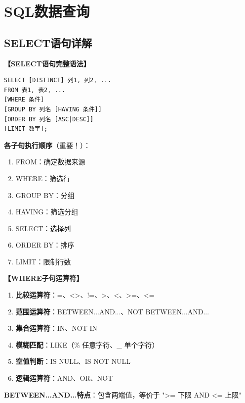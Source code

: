 \documentclass[12pt, a4paper]{article}
\newenvironment{bluebox}[1]{%
  \begin{trivlist}
  \item[\hskip\labelsep \textbf{#1}]
  \setlength{\parskip}{0.5ex}
  \setlength{\itemsep}{0.5ex}
}{%
  \end{trivlist}
}
\begin{document}
\section{SQL数据查询}

\subsection{SELECT语句详解}

\begin{bluebox}{SELECT语句结构}
	\textbf{【SELECT语句完整语法】}

	\begin{verbatim}
SELECT [DISTINCT] 列1, 列2, ...
FROM 表1, 表2, ...
[WHERE 条件]
[GROUP BY 列名 [HAVING 条件]]
[ORDER BY 列名 [ASC|DESC]]
[LIMIT 数字];
	\end{verbatim}

	\textbf{各子句执行顺序}（重要！）：
	\begin{enumerate}
		\item FROM：确定数据来源
		\item WHERE：筛选行
		\item GROUP BY：分组
		\item HAVING：筛选分组
		\item SELECT：选择列
		\item ORDER BY：排序
		\item LIMIT：限制行数
	\end{enumerate}
\end{bluebox}

\begin{bluebox}{WHERE子句条件}
	\textbf{【WHERE子句运算符】}

	\begin{enumerate}[leftmargin=*, label=\textbf{\arabic*.}]
		\item \textbf{比较运算符}：=、<>、!=、>、<、>=、<=
		\item \textbf{范围运算符}：BETWEEN...AND...、NOT BETWEEN...AND...
		\item \textbf{集合运算符}：IN、NOT IN
		\item \textbf{模糊匹配}：LIKE（\% 任意字符、\_ 单个字符）
		\item \textbf{空值判断}：IS NULL、IS NOT NULL
		\item \textbf{逻辑运算符}：AND、OR、NOT
	\end{enumerate}

	\textbf{BETWEEN...AND...特点}：包含两端值，等价于 ">= 下限 AND <= 上限"
\end{bluebox}
\end{document}
